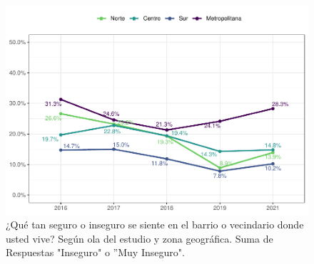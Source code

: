 \documentclass[
  12pt,
]{book}
\begin{document}
\begin{figure}

{\centering \includegraphics{reporte-elsoc_files/figure-latex/seguri-zona-1} 

}

\caption{¿Qué tan seguro o inseguro se siente en el barrio o vecindario donde usted vive? Según ola del estudio y zona geográfica. Suma de Respuestas "Inseguro" o ”Muy Inseguro".}\label{fig:seguri-zona}
\end{figure}
\end{document}
